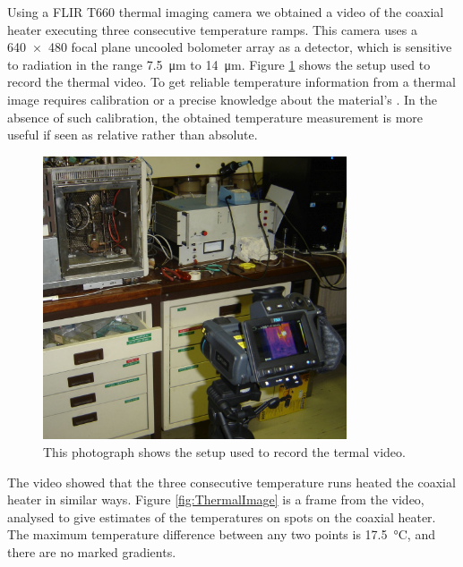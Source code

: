 Using a FLIR{\texttrademark} T660 thermal imaging camera we obtained a video of
the coaxial heater executing three consecutive temperature ramps. This camera
uses a \num{640 x 480} focal plane uncooled bolometer array as a detector, which
is sensitive to radiation in the range \SI{7.5}{\micro\metre} to
\SI{14}{\micro\metre}. Figure \ref{fig:ThermalImageSetup} shows the setup used
to record the thermal video. To get reliable temperature information from a
thermal image requires calibration or a precise knowledge about the material's
. In the absence of such calibration, the obtained
temperature measurement is more useful if seen as relative rather than absolute.

\begin{figure}
	\centering
	\includegraphics[width=0.8\textwidth]{Figures/ThermalImageSetup}
	\decoRule
	
\caption[A photograph of the setup used to record the thermal video]{This
photograph shows the setup used to record the termal video.}
	
	\label{fig:ThermalImageSetup}
\end{figure}

The video showed that the three consecutive temperature runs heated the coaxial
heater in similar ways. Figure \ref{fig:ThermalImage} is a frame from the video,
analysed to give estimates of the temperatures on spots on the coaxial heater.
The maximum temperature difference between any two points is
\SI{17.5}{\celsius}, and there are no marked gradients.

